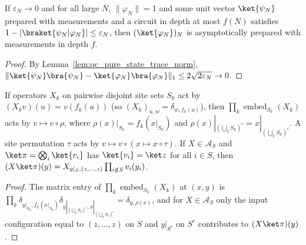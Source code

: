 \begin{lemma}
    \label{lem:qc_asymptotic_preparation_of_overlap}
    \leanok
    If $\varepsilon_N\to0$ and for all large $N$, $\lVert\varphi_N\rVert=1$ and some unit vector $\ket{\psi_N}$ prepared with measurements and a circuit in depth at most $f(N)$ satisfies $1-\lvert\braket{\psi_N|\varphi_N}\rvert\leq\varepsilon_N$, then $(\ket{\varphi_N})_N$ is asymptotically prepared with measurements in depth $f$.
\end{lemma}
\begin{proof}
    \leanok
    By Lemma~\ref{lem:qc_pure_state_trace_norm}, $\lVert\ket{\psi_N}\bra{\psi_N}-\ket{\varphi_N}\bra{\varphi_N}\rVert_1\le 2\sqrt{2\varepsilon_N}\to0$.
\end{proof}

\begin{lemma}
    \label{lem:qc_configuration_layers}
    \leanok
    If operators $X_k$ on pairwise disjoint site sets $S_k$ act by $(X_k v)(u)=v(f_k(u))$ (so $(X_k)_{u,w}=\delta_{w,f_k(u)}$), then $\prod_k\operatorname{embed}_{S_k}(X_k)$ acts by $v\mapsto v\circ\rho$, where $\rho(x)|_{S_k}=f_k(x|_{S_k})$ and $\rho(x)|_{(\bigcup_k S_k)^c}=x|_{(\bigcup_k S_k)^c}$. A site permutation $\tau$ acts by $v\mapsto v\circ(x\mapsto x\circ\tau)$. If $X\in\mathcal A_S$ and $\ket\pi=\bigotimes_i\ket{v_i}$ has $\ket{v_i}=\ket z$ for all $i\in S$, then $(X\ket\pi)(y)=X_{y|_S,(z,\dots,z)}\prod_{i\notin S}v_i(y_i)$.
\end{lemma}
\begin{proof}
    \leanok
    The matrix entry of $\prod_k\operatorname{embed}_{S_k}(X_k)$ at $(x,y)$ is $\prod_k\delta_{y|_{S_k},f_k(x|_{S_k})}\delta_{y|_{(\bigcup_k S_k)^c},x|_{(\bigcup_k S_k)^c}}=\delta_{y,\rho(x)}$, and for $X\in\mathcal A_S$ only the input configuration equal to $(z,\dots,z)$ on $S$ and $y|_{S^c}$ on $S^c$ contributes to $(X\ket\pi)(y)$.
\end{proof}

